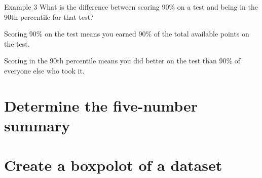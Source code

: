 \documentclass[t]{beamer}
\begin{document}
\begin{frame}{Example 3}
What is the difference between scoring 90\% on a test and being in the 90th percentile for that test?	\newline\\	\pause

Scoring 90\% on the test means you earned 90\% of the total available points on the test.	\newline\\	\pause

Scoring in the 90th percentile means you did better on the test than 90\% of everyone else who took it.
\end{frame}

\section{Determine the five-number summary}

\section{Create a boxpolot of a dataset}
\end{document}
